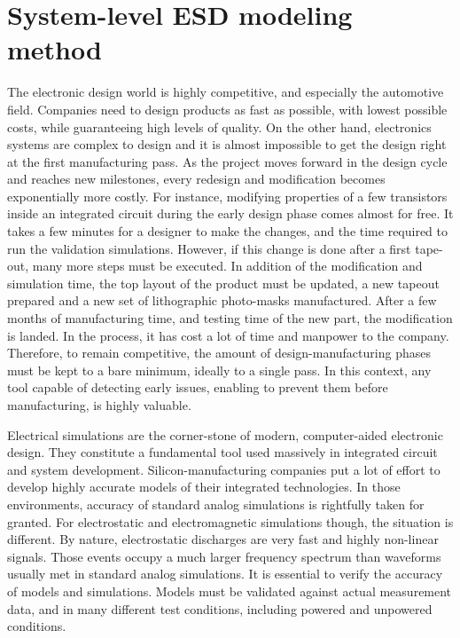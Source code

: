 \section{System-level ESD modeling method}
\label{sec:esd-modeling}

The electronic design world is highly competitive, and especially the automotive field.
Companies need to design products as fast as possible, with lowest possible costs, while guaranteeing high levels of quality.
On the other hand, electronics systems are complex to design and it is almost impossible to get the design right at the first manufacturing pass.
As the project moves forward in the design cycle and reaches new milestones, every redesign and modification becomes exponentially more costly.
For instance, modifying properties of a few transistors inside an integrated circuit during the early design phase comes almost for free.
It takes a few minutes for a designer to make the changes, and the time required to run the validation simulations.
However, if this change is done after a first tape-out, many more steps must be executed.
In addition of the modification and simulation time, the top layout of the product must be updated, a new tapeout prepared and a new set of lithographic photo-masks manufactured.
After a few months of manufacturing time, and testing time of the new part, the modification is landed.
In the process, it has cost a lot of time and manpower to the company.
Therefore, to remain competitive, the amount of design-manufacturing phases must be kept to a bare minimum, ideally to a single pass.
In this context, any tool capable of detecting early issues, enabling to prevent them before manufacturing, is highly valuable.

Electrical simulations are the corner-stone of modern, computer-aided electronic design.
They constitute a fundamental tool used massively in integrated circuit and system development.
Silicon-manufacturing companies put a lot of effort to develop highly accurate models of their integrated technologies.
In those environments, accuracy of standard analog simulations is rightfully taken for granted.
For electrostatic and electromagnetic simulations though, the situation is different.
By nature, electrostatic discharges are very fast and highly non-linear signals.
Those events occupy a much larger frequency spectrum than waveforms usually met in standard analog simulations.
It is essential to verify the accuracy of models and simulations.
Models must be validated against actual measurement data, and in many different test conditions, including powered and unpowered conditions.

